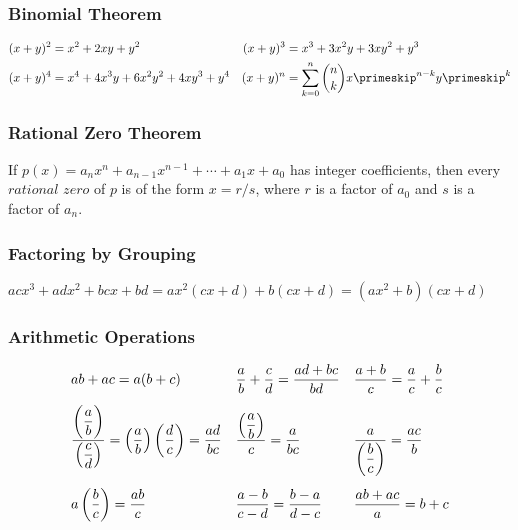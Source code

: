 \vfill

\subsubsection*{Binomial Theorem}\vspace{-\baselineskip}
\begin{align*}
(x+y)^2 &= x^2 + 2xy + y^2 &
(x+y)^3 &= x^3 + 3x^2y + 3xy^2 + y^3 \\
(x+y)^4 &= x^4 + 4x^3y + 6x^2y^2 + 4xy^3 + y^4 &
(x+y)^n &=\sum_{k=0}^n \binom{n}{k}x\primeskip^{n-k}y\primeskip^k
\end{align*}

\vfill

\subsubsection*{Rational Zero Theorem}
If $p(x) = a_n x^n + a_{n-1} x^{n-1} + \dotsb + a_1 x + a_0$ has integer coefficients, then every $rational$ $zero$ of $p$ is of the form
$x=r/s$, where $r$ is a factor of $a_0$ and $s$ is a factor of $a_n$.

\vfill

\subsubsection*{Factoring by Grouping}
$ac x^3 + ad x^2 + bcx + bd = ax^2(cx+d)+b(cx+d)=(ax^2+b)(cx+d)$

\vfill

\subsubsection*{Arithmetic Operations}\vspace{-\baselineskip}
\begin{align*}
&ab+ac=a(b+c) && \frac{a}{b}+\frac{c}{d} = \frac{ad+bc}{bd} && \frac{a+b}{c} = \frac{a}{c} + \frac{b}{c} \\[.3\baselineskip]
&\frac{\left(\dfrac{a\vphantom{d}}{b}\right)}{\left(\dfrac{c}{d}\right)}=\left(\frac{a}{b}\right)\left(\frac{d}{c}\right)=\frac{ad}{bc} 
&& \frac{\left(\dfrac{a}{b}\right)}{c} = \frac{a}{bc}
&& \frac{a}{\left(\dfrac{b}{c}\right)} = \frac{ac}{b} \\[.3\baselineskip]
&a\left(\frac{b}{c}\right)= \frac{ab}{c} && \frac{a-b}{c-d}=\frac{b-a}{d-c} && \frac{ab+ac}{a}=b+c
\end{align*}

\vfill

